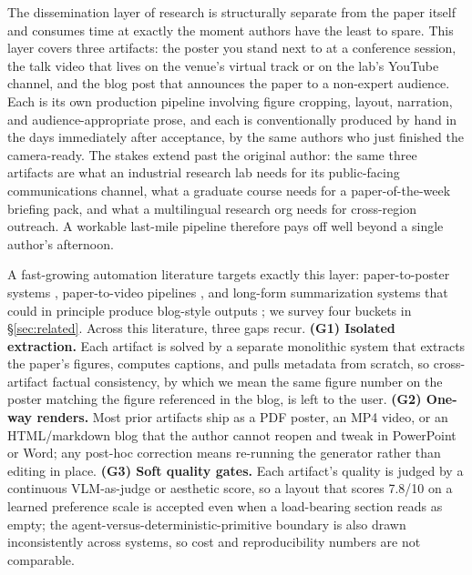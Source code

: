 \documentclass{article}
\begin{document}
The dissemination layer of research is structurally separate from the paper itself and consumes time at exactly the moment authors have the least to spare. This layer covers three artifacts: the poster you stand next to at a conference session, the talk video that lives on the venue's virtual track or on the lab's YouTube channel, and the blog post that announces the paper to a non-expert audience. Each is its own production pipeline involving figure cropping, layout, narration, and audience-appropriate prose, and each is conventionally produced by hand in the days immediately after acceptance, by the same authors who just finished the camera-ready. The stakes extend past the original author: the same three artifacts are what an industrial research lab needs for its public-facing communications channel, what a graduate course needs for a paper-of-the-week briefing pack, and what a multilingual research org needs for cross-region outreach. A workable last-mile pipeline therefore pays off well beyond a single author's afternoon.

A fast-growing automation literature targets exactly this layer: paper-to-poster systems \citep{paper2poster, posterforest, p2p, postergen}, paper-to-video pipelines \citep{paper2video, videoagent2025, preacher2025}, and long-form summarization systems that could in principle produce blog-style outputs \citep{hera2025, ptspi2025, gosum2024}; we survey four buckets in \S\ref{sec:related}. Across this literature, three gaps recur. \textbf{(G1) Isolated extraction.} Each artifact is solved by a separate monolithic system that extracts the paper's figures, computes captions, and pulls metadata from scratch, so cross-artifact factual consistency, by which we mean the same figure number on the poster matching the figure referenced in the blog, is left to the user. \textbf{(G2) One-way renders.} Most prior artifacts ship as a PDF poster, an MP4 video, or an HTML/markdown blog that the author cannot reopen and tweak in PowerPoint or Word; any post-hoc correction means re-running the generator rather than editing in place. \textbf{(G3) Soft quality gates.} Each artifact's quality is judged by a continuous VLM-as-judge or aesthetic score, so a layout that scores 7.8/10 on a learned preference scale is accepted even when a load-bearing section reads as empty; the agent-versus-deterministic-primitive boundary is also drawn inconsistently across systems, so cost and reproducibility numbers are not comparable.
\end{document}
